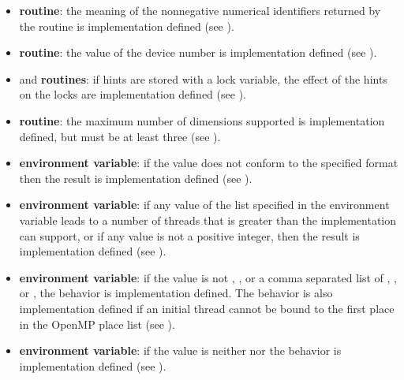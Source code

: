 \begin{itemize}
\item {} \textbf{routine}: the meaning of the 
nonnegative numerical identifiers returned by the 
 routine is implementation defined (see 
).

\item {} \textbf{routine}: the value of
  the device number is implementation defined (see ).

\item {} and  \textbf{routines}: 
if hints are stored with a lock variable, the effect of the hints on the locks are implementation defined (see ).

\item {} \textbf{routine}: 
  the maximum number of dimensions supported is implementation defined, but
  must be at least three (see ).

\item {} \textbf{environment variable}: if the value does not 
conform to the specified format then the result is implementation defined (see 
).

\item {} \textbf{environment variable}: if any value of the list specified in the 
 environment variable leads to a number of threads that is 
greater than the implementation can support, or if any value is not a positive integer, 
then the result is implementation defined (see ).

\item {} \textbf{environment variable}: if the value is not , , or a 
comma separated list of , , or , the behavior is 
implementation defined. The behavior is also implementation defined if an initial 
thread cannot be bound to the first place in the OpenMP place list (see 
).

\item {} \textbf{environment variable}: if the value is neither 
 nor  the behavior is implementation defined (see 
).


\end{itemize}
